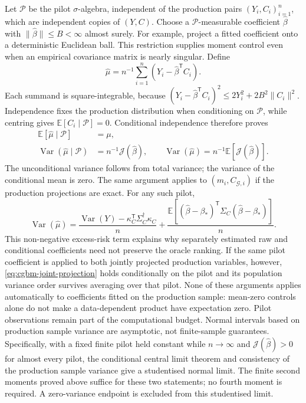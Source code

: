 \documentclass[11pt]{article}
\begin{document}
Let $\mathcal P$ be the pilot $\sigma$-algebra, independent of the
production pairs $(Y_i,C_i)_{i=1}^n$, which are independent copies of
$(Y,C)$. Choose a $\mathcal P$-measurable coefficient
$\widehat\beta$ with $\|\widehat\beta\|\leq B<\infty$ almost surely.
For example, project a fitted coefficient onto a deterministic Euclidean
ball. This restriction supplies moment control even when an empirical
covariance matrix is nearly singular. Define
\begin{equation}
 \widehat\mu=n^{-1}\sum_{i=1}^n
 (Y_i-\widehat\beta^{\mathsf T}C_i).
 \label{eq:cgbm-independent-pilot-estimator}
\end{equation}
Each summand is square-integrable, because
$(Y_i-\widehat\beta^{\mathsf T}C_i)^2
\leq2Y_i^2+2B^2\|C_i\|^2$.
Independence fixes the production distribution when conditioning on
$\mathcal P$, while centring gives
$\mathbb E[C_i\mid\mathcal P]=0$. Conditional independence therefore
proves
\begin{align}
 \mathbb E[\widehat\mu\mid\mathcal P]&=\mu,
 \label{eq:cgbm-pilot-unbiased}\\
 \operatorname{Var}(\widehat\mu\mid\mathcal P)
 &=n^{-1}\mathcal J(\widehat\beta),\qquad
 \operatorname{Var}(\widehat\mu)
 =n^{-1}\mathbb E[\mathcal J(\widehat\beta)].
 \label{eq:cgbm-pilot-variance}
\end{align}
The unconditional variance follows from total variance; the variance of
the conditional mean is zero. The same argument applies to
$(m_i,C_{\mathcal G,i})$ if the production projections are exact.
For any such pilot,
\begin{equation}
 \operatorname{Var}(\widehat\mu)
 =\frac{\operatorname{Var}(Y)-\kappa_C^{\mathsf T}\Sigma_C^\dagger \kappa_C}{n}
 +\frac{\mathbb E[(\widehat\beta-\beta_*)^{\mathsf T}
 \Sigma_C(\widehat\beta-\beta_*)]}{n}.
 \label{eq:cgbm-pilot-excess-risk}
\end{equation}
This non-negative excess-risk term explains why separately estimated
raw and conditional coefficients need not preserve the oracle ranking.
If the same pilot coefficient is applied to both jointly projected
production variables, however,
\eqref{eq:cgbm-joint-projection} holds conditionally on the pilot and
its population variance order survives averaging over that pilot.
None of these arguments applies automatically to coefficients fitted
on the production sample: mean-zero controls alone do not make a
data-dependent product have expectation zero. Pilot observations remain
part of the computational budget. Normal intervals based on production
sample variance are asymptotic, not finite-sample guarantees. Specifically,
with a fixed finite pilot held constant while $n\to\infty$ and
$\mathcal J(\widehat\beta)>0$ for almost every pilot, the conditional
central limit theorem and consistency of the production sample variance
give a studentised normal limit. The finite second moments proved above
suffice for these two statements; no fourth moment is required.
A zero-variance endpoint is excluded from this studentised limit.
\end{document}

